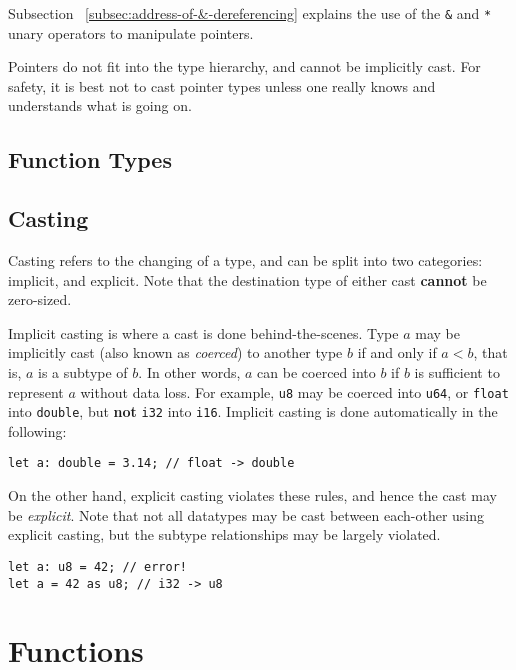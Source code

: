 \documentclass{article}
\begin{document}
    Subsection ~\ref{subsec:address-of-&-dereferencing} explains the use of the \texttt{\&} and \texttt{*} unary operators to manipulate pointers.

    Pointers do not fit into the type hierarchy, and cannot be implicitly cast.
    For safety, it is best not to cast pointer types unless one really knows and understands what is going on.

    \subsection{Function Types}\label{subsec:function-types}


    \subsection{Casting}\label{subsec:type-casting}

    Casting refers to the changing of a type, and can be split into two categories: implicit, and explicit.
    Note that the destination type of either cast \textbf{cannot} be zero-sized.

    Implicit casting is where a cast is done behind-the-scenes.
    Type \(a\) may be implicitly cast (also known as \textit{coerced}) to another type \(b\) if and only if \(a < b\), that is, \(a\) is a subtype of \(b\).
    In other words, \(a\) can be coerced into \(b\) if \(b\) is sufficient to represent \(a\) without data loss.
    For example, \texttt{u8} may be coerced into \texttt{u64}, or \texttt{float} into \texttt{double}, but \textbf{not} \texttt{i32} into \texttt{i16}.
    Implicit casting is done automatically in the following:

    \begin{lstlisting}[language=CustomLang]
let a: double = 3.14; // float -> double
    \end{lstlisting}

    On the other hand, explicit casting violates these rules, and hence the cast may be \textit{explicit}.
    Note that not all datatypes may be cast between each-other using explicit casting, but the subtype relationships may be largely violated.

    \begin{lstlisting}[language=CustomLang]
let a: u8 = 42; // error!
let a = 42 as u8; // i32 -> u8
    \end{lstlisting}

    \section{Functions}\label{sec:functions}
\end{document}
